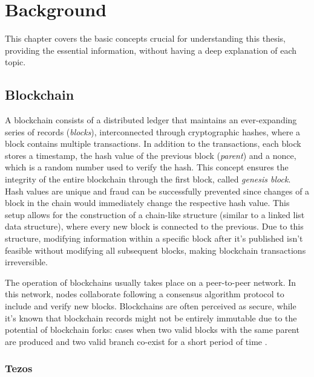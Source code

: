 \chapter{Background}

This chapter covers the basic concepts crucial for understanding this thesis, providing the essential information, without having a deep explanation of each topic.

\section{Blockchain}

A blockchain consists of a distributed ledger that maintains an ever-expanding series of records (\textit{blocks}), interconnected through cryptographic hashes, where a block contains multiple transactions. In addition to the transactions, each block stores a timestamp, the hash value of the previous block (\textit{parent}) and a nonce, which is a random number used to verify the hash. This concept ensures the integrity of the entire blockchain through the first block, called \textit{genesis block}. Hash values are unique and fraud can be successfully prevented since changes of a block in the chain would immediately change the respective hash value. This setup allows for the construction of a chain-like structure (similar to a linked list data structure), where every new block is connected to the previous. Due to this structure, modifying information within a specific block after it's published isn't feasible without modifying all subsequent blocks, making blockchain transactions irreversible. \cite{nofer_blockchain_2017}

The operation of blockchains usually takes place on a peer-to-peer network. In this network, nodes collaborate following a consensus algorithm protocol to include and verify new blocks. Blockchains are often perceived as secure, while it's known that blockchain records might not be entirely immutable due to the potential of blockchain forks: cases when two valid blocks with the same parent are produced and two valid branch co-exist for a short period of time \cite{goldberg_short_2019}.

\subsection{Tezos}

